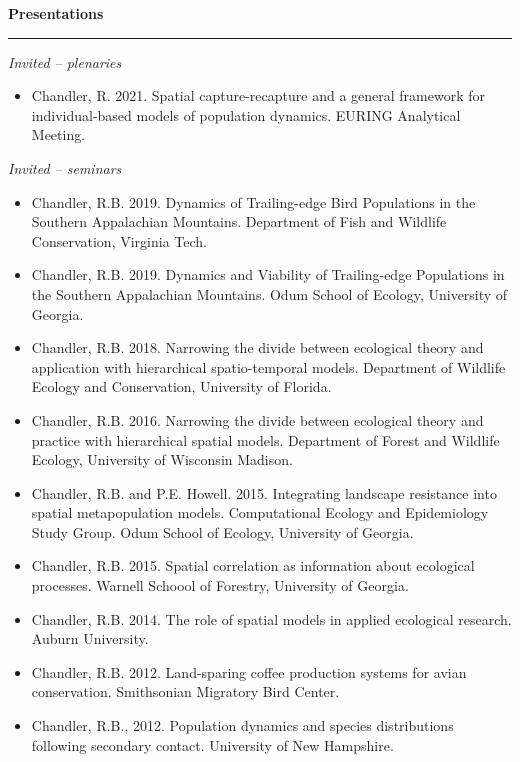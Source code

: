 \vspace{0.5cm}


{\large \bf Presentations} \\
\rule[3mm]{\textwidth}{0.3mm}

\emph{Invited -- plenaries}

\begin{itemize}

\item Chandler, R. 2021. Spatial capture-recapture and a general
  framework for individual-based models of population dynamics.
  EURING Analytical Meeting. 

\end{itemize}  

\emph{Invited -- seminars}

\begin{itemize}

\item Chandler, R.B. 2019. Dynamics of Trailing-edge Bird Populations
  in the Southern Appalachian Mountains. Department of Fish and
  Wildlife Conservation, Virginia Tech.

\item Chandler, R.B. 2019. Dynamics and Viability of Trailing-edge
  Populations in the Southern Appalachian Mountains. Odum School of
  Ecology, University of Georgia.

\item Chandler, R.B. 2018. Narrowing the divide between ecological
  theory and application with hierarchical spatio-temporal
  models. Department of Wildlife Ecology and Conservation, 
  University of Florida.

\item Chandler, R.B. 2016. Narrowing the divide between ecological
  theory and practice with hierarchical spatial models. Department of
  Forest and Wildlife Ecology, University of Wisconsin Madison. 

\item Chandler, R.B. and P.E. Howell. 2015. Integrating landscape
  resistance into spatial metapopulation models. Computational Ecology
  and Epidemiology Study Group. Odum School of Ecology, University of
  Georgia. 

\item Chandler, R.B. 2015. Spatial correlation as information about
  ecological processes. Warnell Schoool of Forestry, University of
  Georgia. 

\item Chandler, R.B. 2014. The role of spatial models in applied
  ecological research. Auburn University.

\item Chandler, R.B. 2012. Land-sparing coffee production systems for avian
  conservation. Smithsonian Migratory Bird Center. 

\item Chandler, R.B., 2012. Population dynamics and species distributions following
  secondary contact. University of New Hampshire.

\end{itemize}

